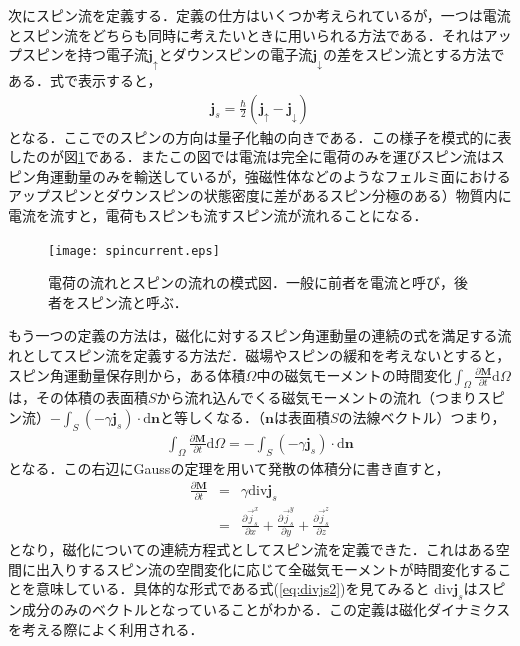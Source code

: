 次にスピン流を定義する．定義の仕方はいくつか考えられているが，一つは電流とスピン流をどちらも同時に考えたいときに用いられる方法である．それはアップスピンを持つ電子流$\bm{j}_{\uparrow}$とダウンスピンの電子流$\bm{j}_{\downarrow}$の差をスピン流とする方法である．式で表示すると，
\begin{eqnarray}
\bm{j}_{s}=\frac{\hbar}{2}(\bm{j}_{\uparrow}-\bm{j}_{\downarrow})
\end{eqnarray}
となる．ここでのスピンの方向は量子化軸の向きである．この様子を模式的に表したのが図\ref{spincurrent}である．またこの図では電流は完全に電荷のみを運びスピン流はスピン角運動量のみを輸送しているが，強磁性体などのようなフェルミ面におけるアップスピンとダウンスピンの状態密度に差があるスピン分極のある）物質内に電流を流すと，電荷もスピンも流すスピン流が流れることになる．

\begin{figure}[htbp]
 \begin{center}
  \texttt{[image: spincurrent.eps]}
 \end{center}
 \caption{電荷の流れとスピンの流れの模式図．一般に前者を電流と呼び，後者をスピン流と呼ぶ．}
 \label{spincurrent}
\end{figure}




もう一つの定義の方法は，磁化に対するスピン角運動量の連続の式を満足する流れとしてスピン流を定義する方法だ．磁場やスピンの緩和を考えないとすると，スピン角運動量保存則から，ある体積$\Omega$中の磁気モーメントの時間変化$\int_{\Omega} \frac{\partial \bm{M}}{\partial t} \mathrm d\Omega$は，その体積の表面積$S$から流れ込んでくる磁気モーメントの流れ（つまりスピン流）$-\int_{S}(-\gamma\bm{j}_{s})\cdot\mathrm d\bm{n}$と等しくなる．（$\bm{n}$は表面積$S$の法線ベクトル）つまり，
\begin{eqnarray}
\int_{\Omega} \frac{\partial \bm{M}}{\partial t} \mathrm d\Omega=-\int_{S}(-\gamma\bm{j}_{s})\cdot\mathrm d\bm{n}
\end{eqnarray}
となる．この右辺にGaussの定理を用いて発散の体積分に書き直すと，
\begin{eqnarray}
\frac{\partial \bm{M}}{\partial t}&=&\gamma\mathrm{div}\bm{j}_{s}
\label{eq:divjs1}\\
&=&\frac{\partial\vec{j}_{s}^{x}}{\partial x}+\frac{\partial\vec{j}_{s}^{y}}{\partial y}+\frac{\partial\vec{j}_{s}^{z}}{\partial z}\label{eq:divjs2}
\end{eqnarray}
となり，磁化についての連続方程式としてスピン流を定義できた．これはある空間に出入りするスピン流の空間変化に応じて全磁気モーメントが時間変化することを意味している\cite{kiselev2003microwave}．具体的な形式である式(\ref{eq:divjs2})を見てみると $\mathrm{div}\bm{j}_{s}$はスピン成分のみのベクトルとなっていることがわかる．この定義は磁化ダイナミクスを考える際によく利用される．\\

